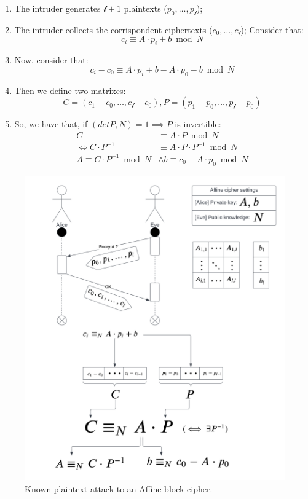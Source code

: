\begin{enumerate}
    \item The intruder generates $\mathcal{l} + 1$ plaintexts ($p_{0}, \dots, p_{\mathcal{l}}$);
    \item The intruder collects the corrispondent ciphertexts ($c_{0}, \dots, c_{\mathcal{l}}$); Consider that:
    \[c_{i} \equiv A \cdot p_{i} + b \bmod N\]
    \item Now, consider that:
    \[c_{i} - c_{0} \equiv A \cdot p_{i} + b - A \cdot p_{0} - b \bmod N\]
    \item Then we define two matrixes:
    \[C = (c_{1} - c_{0}, \dots, c_{\mathcal{l}} - c_{0}), P = (p_{1} - p_{0}, \dots, p_{\mathcal{l}} - p_{0})\]
    \item So, we have that, if $(det P, N) = 1 \implies P$ is invertible:
    \begin{align*}
        C &\equiv A \cdot P \bmod N\\
        \iff C \cdot P^{-1} &\equiv A \cdot P \cdot P^{-1} \bmod N \\
        A \equiv C \cdot P^{-1} \bmod N  &\land b \equiv c_{0} - A \cdot p_{0} \bmod N
    \end{align*}
\end{enumerate}

\begin{figure}[h]
    \centering
    \includegraphics[width=\textwidth]{img/Affine_Block_Cipher_Known-plaintext_Attack.png}
    \caption{Known plaintext attack to an Affine block cipher.}
\end{figure}
